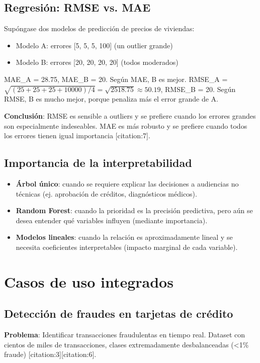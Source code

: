 \documentclass[12pt,a4paper,openany,oneside]{book}
\begin{document}
\subsection{Regresión: RMSE vs. MAE}
Supóngase dos modelos de predicción de precios de viviendas:
\begin{itemize}
    \item Modelo A: errores [5, 5, 5, 100] (un outlier grande)
    \item Modelo B: errores [20, 20, 20, 20] (todos moderados)
\end{itemize}
MAE_A = 28.75, MAE_B = 20. Según MAE, B es mejor.
RMSE_A = \(\sqrt{(25+25+25+10000)/4} = \sqrt{2518.75} \approx 50.19\), RMSE_B = 20. Según RMSE, B es mucho mejor, porque penaliza más el error grande de A.

\textbf{Conclusión}: RMSE es sensible a outliers y se prefiere cuando los errores grandes son especialmente indeseables. MAE es más robusto y se prefiere cuando todos los errores tienen igual importancia [citation:7].

\subsection{Importancia de la interpretabilidad}
\begin{itemize}
    \item \textbf{Árbol único}: cuando se requiere explicar las decisiones a audiencias no técnicas (ej. aprobación de créditos, diagnósticos médicos).
    \item \textbf{Random Forest}: cuando la prioridad es la precisión predictiva, pero aún se desea entender qué variables influyen (mediante importancia).
    \item \textbf{Modelos lineales}: cuando la relación es aproximadamente lineal y se necesita coeficientes interpretables (impacto marginal de cada variable).
\end{itemize}

\section{Casos de uso integrados}

\subsection{Detección de fraudes en tarjetas de crédito}
\textbf{Problema}: Identificar transacciones fraudulentas en tiempo real. Dataset con cientos de miles de transacciones, clases extremadamente desbalanceadas (<1\% fraude) [citation:3][citation:6].
\end{document}
